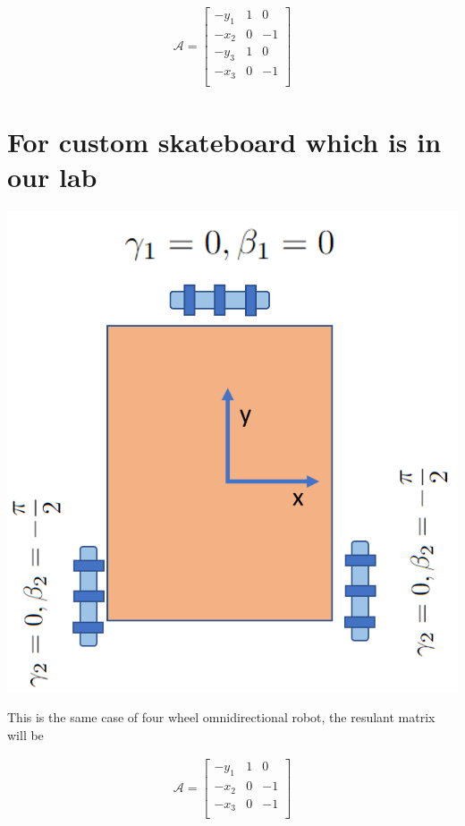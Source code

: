\documentclass{article}
\begin{document}
\begin{align}
    \mathcal{A} =
    \begin{bmatrix}
        -y_1 & 1 & 0  \\
        -x_2 & 0 & -1 \\
        -y_3 & 1 & 0  \\
        -x_3 & 0 & -1 \\
    \end{bmatrix}
\end{align}

\section{For custom skateboard which is in our lab}

\includegraphics{custom_skateboard.png}

This is the same case of four wheel omnidirectional robot,
the resulant matrix will be

\begin{align}
    \mathcal{A} =
    \begin{bmatrix}
        -y_1 & 1 & 0  \\
        -x_2 & 0 & -1 \\
        -x_3 & 0 & -1 \\
    \end{bmatrix}
\end{align}
\end{document}
